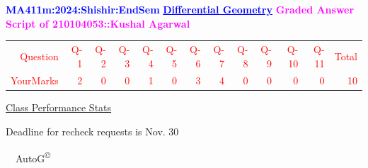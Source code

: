\documentclass{article}                              %
\begin{document}
%
\vspace*{1in}

\begin{center}
	\textbf{\textcolor{blue}{\LARGE MA411m:2024:Shishir:EndSem}}
	\vskip 1cm
	\textbf{\textcolor{blue}{\underline{\Large Differential Geometry}}}
	\vskip 1cm
	\textbf{\textcolor{magenta}{\LARGE Graded Answer Script of 210104053::Kushal Agarwal}}
\end{center}


\begin{center}
	\Huge 
	\textcolor{red}{
	\begin{tabular}{*{13}{r}}
		Question&Q-1& Q-2& Q-3& Q-4& Q-5& Q-6& Q-7& Q-8& Q-9& Q-10& Q-11&Total  \\
        	YourMarks&2&0&0&1&0&3&4&0&0&0&0&10
	\end{tabular}
	}
        \vskip 2cm
	\large
	\underline{Class Performance Stats}
	\DTLsetseparator{;}
	\begin{table}[htbp]
		\centering
	\end{table}
	\vskip 1cm
	Deadline for recheck requests is Nov. 30
\end{center}
\ \vfill \ \hfill \small AutoG\textsuperscript{\copyright}
\newpage
%
\end{document}
